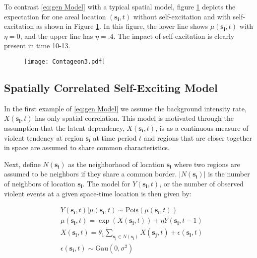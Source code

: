 \documentclass[11pt]{isuthesis}
\begin{document}
To contrast \eqref{eq:gen Model} with a typical spatial model, figure \ref{exc} depicts the expectation for one areal location $(\boldsymbol{s_i},t)$ without self-excitation and with self-excitation as shown in Figure \ref{exc}. In this figure, the lower line shows $\mu(\boldsymbol{s_i},t)$ with $\eta=0$, and the upper line has $\eta=.4$.  The impact of self-excitation is clearly present in time 10-13.

\begin{figure}[h]
	\begin{center} %
		\vspace{6pc}
		\texttt{[image: Contageon3.pdf]}
		\label{exc} 
	\end{center}
\end{figure}



\subsection{Spatially Correlated Self-Exciting Model}

In the first example of \eqref{eq:gen Model} we assume the background intensity rate, $X(\boldsymbol{s_i},t)$ has only spatial correlation.  This model is motivated through the assumption that the latent dependency, $X(\boldsymbol{s_i},t)$, is as a continuous measure of violent tendency at region $\boldsymbol{s_i}$ at time period $t$ and regions that are closer together in space are assumed to share common characteristics.  

Next, define $N(\boldsymbol{s_i})$ as the neighborhood of location $\boldsymbol{s_i}$ where two regions are assumed to be neighbors if they share a common border.   $|N(\boldsymbol{s_i})|$ is the number of neighbors of location $\boldsymbol{s_i}$.  The model for $Y(\boldsymbol{s_i},t)$, or the number of observed violent events at a given space-time location is then given by:

\begin{align}
& Y(\boldsymbol{s_i},t)|\mu(\boldsymbol{s_i},t) \sim \mbox{Pois}(\mu(\boldsymbol{s_i},t)) \label{eq:Full Model}\\
& \mu(\boldsymbol{s_i},t) = \exp(X(\boldsymbol{s_i},t)) + \eta Y(\boldsymbol{s_i},t-1) \nonumber \\
& X(\boldsymbol{s_i},t) = \theta_1 \sum_{\boldsymbol{s_j}\in N(\boldsymbol{s_i})}X(\boldsymbol{s_j},t) + \epsilon(\boldsymbol{s_i},t) \nonumber\\
&\epsilon(\boldsymbol{s_i},t) \sim \mbox{Gau}(0,\sigma^2) \nonumber
\end{align}
\end{document}

